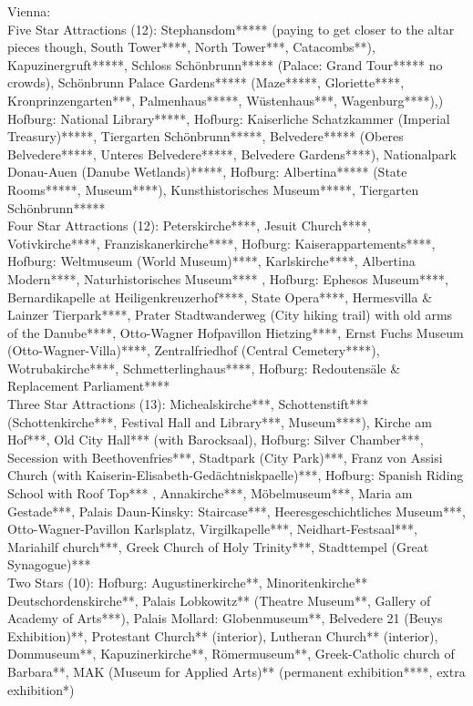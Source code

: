 
Vienna: \\
Five Star Attractions (12): Stephansdom***** (paying to get closer to the altar pieces though, South Tower****, North Tower***, Catacombs**), Kapuzinergruft*****, Schloss Sch\"onbrunn***** (Palace: Grand Tour***** no crowds), Sch\"onbrunn Palace Gardens***** (Maze*****, Gloriette****, Kronprinzengarten***, Palmenhaus*****, W\"ustenhaus***, Wagenburg****),) Hofburg: National Library*****, Hofburg: Kaiserliche Schatzkammer (Imperial Treasury)*****, Tiergarten Sch\"onbrunn*****, Belvedere***** (Oberes Belvedere*****, Unteres Belvedere*****, Belvedere Gardens****), Nationalpark Donau-Auen (Danube Wetlands)*****, Hofburg: Albertina***** (State Rooms*****, Museum****),  Kunsthistorisches Museum*****, Tiergarten Sch\"onbrunn*****\\

Four Star Attractions (12): Peterskirche****, Jesuit Church****, Votivkirche****, Franziskanerkirche****, Hofburg: Kaiserappartements****, Hofburg: Weltmuseum (World Museum)****, Karlskirche****, Albertina Modern****, Naturhistorisches Museum**** , Hofburg: Ephesos Museum****, Bernardikapelle at Heiligenkreuzerhof****, State Opera****, Hermesvilla \& Lainzer Tierpark****, Prater Stadtwanderweg (City hiking trail) with old arms of the Danube****, Otto-Wagner Hofpavillon Hietzing****, Ernst Fuchs Museum (Otto-Wagner-Villa)****, Zentralfriedhof (Central Cemetery****), Wotrubakirche****, Schmetterlinghaus****, Hofburg: Redoutens\"ale \& Replacement Parliament****\\ 

Three Star Attractions (13):  Michealskirche***, Schottenstift*** (Schottenkirche***, Festival Hall and Library***, Museum****), Kirche am Hof***, Old City Hall*** (with Barocksaal), Hofburg: Silver Chamber***,  Secession with Beethovenfries***, Stadtpark (City Park)***, Franz von Assisi Church (with Kaiserin-Elisabeth-Ged\"achtniskpaelle)***, Hofburg: Spanish Riding School with Roof Top*** , Annakirche***, M\"obelmuseum***, Maria am Gestade***, Palais Daun-Kinsky: Staircase***, Heeresgeschichtliches Museum***, Otto-Wagner-Pavillon Karlsplatz, Virgilkapelle***, Neidhart-Festsaal***, Mariahilf church***, Greek Church of Holy Trinity***, Stadttempel (Great Synagogue)***\\

Two Stars (10): Hofburg: Augustinerkirche**, Minoritenkirche**   Deutschordenskirche**, Palais Lobkowitz** (Theatre Museum**, Gallery of Academy of Arts***), Palais Mollard: Globenmuseum**, Belvedere 21 (Beuys Exhibition)**, Protestant Church** (interior), Lutheran Church** (interior), Dommuseum**, Kapuzinerkirche**, R\"omermuseum**, Greek-Catholic church of Barbara**, MAK (Museum for Applied Arts)** (permanent exhibition****, extra exhibition*)\\

